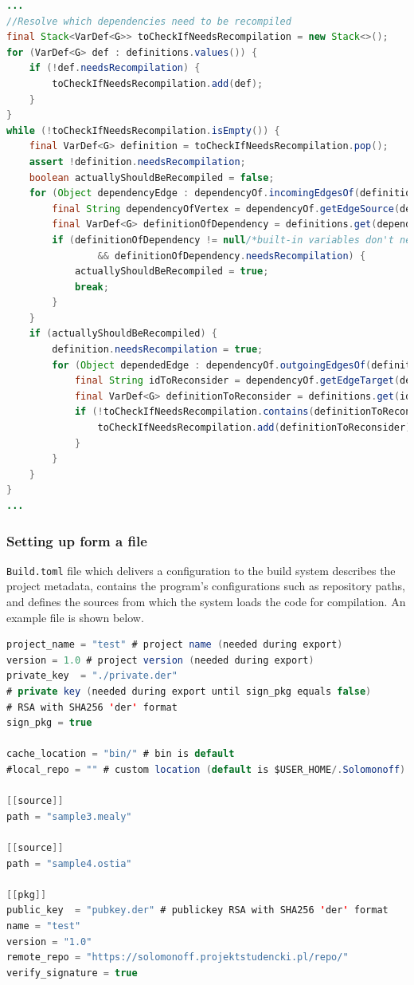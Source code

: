 \begin{lstlisting}[language=Java, frame=single]
...
//Resolve which dependencies need to be recompiled
final Stack<VarDef<G>> toCheckIfNeedsRecompilation = new Stack<>();
for (VarDef<G> def : definitions.values()) {
    if (!def.needsRecompilation) {
        toCheckIfNeedsRecompilation.add(def);
    }
}
while (!toCheckIfNeedsRecompilation.isEmpty()) {
    final VarDef<G> definition = toCheckIfNeedsRecompilation.pop();
    assert !definition.needsRecompilation;
    boolean actuallyShouldBeRecompiled = false;
    for (Object dependencyEdge : dependencyOf.incomingEdgesOf(definition.id)) {
        final String dependencyOfVertex = dependencyOf.getEdgeSource(dependencyEdge);
        final VarDef<G> definitionOfDependency = definitions.get(dependencyOfVertex);
        if (definitionOfDependency != null/*built-in variables don't need to recompiled*/
                && definitionOfDependency.needsRecompilation) {
            actuallyShouldBeRecompiled = true;
            break;
        }
    }
    if (actuallyShouldBeRecompiled) {
        definition.needsRecompilation = true;
        for (Object dependedEdge : dependencyOf.outgoingEdgesOf(definition.id)) {
            final String idToReconsider = dependencyOf.getEdgeTarget(dependedEdge);
            final VarDef<G> definitionToReconsider = definitions.get(idToReconsider);
            if (!toCheckIfNeedsRecompilation.contains(definitionToReconsider)) {
                toCheckIfNeedsRecompilation.add(definitionToReconsider);
            }
        }
    }
}
...
\end{lstlisting}

\hypertarget{setting-up-form-a-file}{%
\subsubsection{Setting up form a file}\label{setting-up-form-a-file}}

\texttt{Build.toml} file which delivers a configuration to the build system
describes the project metadata, contains the program's configurations
such as repository paths, and defines the sources from which the system
loads the code for compilation. An example file is shown below.

\begin{lstlisting}[language=Java, frame=single]
project_name = "test" # project name (needed during export)
version = 1.0 # project version (needed during export)
private_key  = "./private.der" 
# private key (needed during export until sign_pkg equals false) 
# RSA with SHA256 'der' format
sign_pkg = true

cache_location = "bin/" # bin is default 
#local_repo = "" # custom location (default is $USER_HOME/.Solomonoff)

[[source]]
path = "sample3.mealy"

[[source]]
path = "sample4.ostia"

[[pkg]]
public_key  = "pubkey.der" # publickey RSA with SHA256 'der' format
name = "test" 
version = "1.0"
remote_repo = "https://solomonoff.projektstudencki.pl/repo/"
verify_signature = true
\end{lstlisting}

